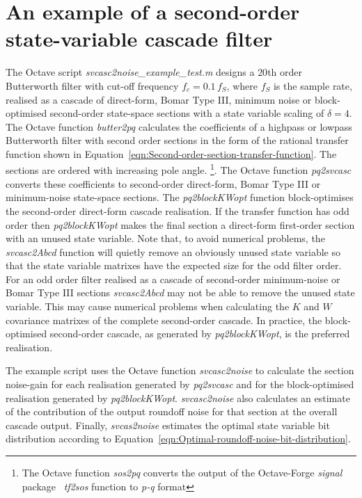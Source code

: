 \documentclass[a4paper,twoside,10pt,english]{report}
\begin{document}
\section{An example of a second-order state-variable cascade filter}
The Octave script \emph{svcasc2noise\_example\_test.m} designs a $20$th order 
Butterworth filter with cut-off frequency $f_{c}=0.1\,f_{S}$, where $f_{S}$ is the
sample rate, realised as a cascade of direct-form, Bomar Type III, minimum noise 
or block-optimised second-order state-space sections with a state variable 
scaling of $\delta=4$. The Octave function \emph{butter2pq} calculates the
coefficients of a highpass or lowpass Butterworth filter with second order 
sections in the form of the rational transfer function shown in
Equation~\ref{eqn:Second-order-section-transfer-function}. The sections are
ordered with increasing pole angle. \footnote{The Octave function \emph{sos2pq} 
converts the output of the Octave-Forge \emph{signal} 
package~\cite{OctaveForge_SignalPackage} \emph{tf2sos} function to \emph{p-q} 
format}. The Octave function \emph{pq2svcasc} converts these coefficients to 
second-order direct-form, Bomar Type III or minimum-noise state-space sections.
The \emph{pq2blockKWopt} function block-optimises the second-order direct-form
cascade realisation. If the transfer function has odd order then 
\emph{pq2blockKWopt} makes the final section a direct-form first-order section 
with an unused state variable. Note that, to avoid numerical problems, the 
\emph{svcasc2Abcd} function will quietly remove an obviously unused state 
variable so that the state variable matrixes have the expected size for the odd
filter order. For an odd order filter realised as a cascade of second-order 
minimum-noise or Bomar Type III sections \emph{svcasc2Abcd} may not be able to 
remove the unused state variable. This may cause numerical problems when 
calculating the $K$ and $W$ covariance matrixes of the complete second-order
cascade. In practice, the block-optimised second-order cascade, as generated by
\emph{pq2blockKWopt}, is the preferred realisation.
  
The example script uses the Octave function \emph{svcasc2noise} to calculate 
the section noise-gain for each realisation generated by \emph{pq2svcasc} and
for the block-optimised realisation generated by \emph{pq2blockKWopt}. 
\emph{svcasc2noise} also calculates an estimate of the contribution of the
output roundoff noise for that section at the overall cascade output. Finally,
\emph{svcas2noise} estimates the optimal state variable bit distribution
according to Equation~\ref{eqn:Optimal-roundoff-noise-bit-distribution}.
\end{document}
